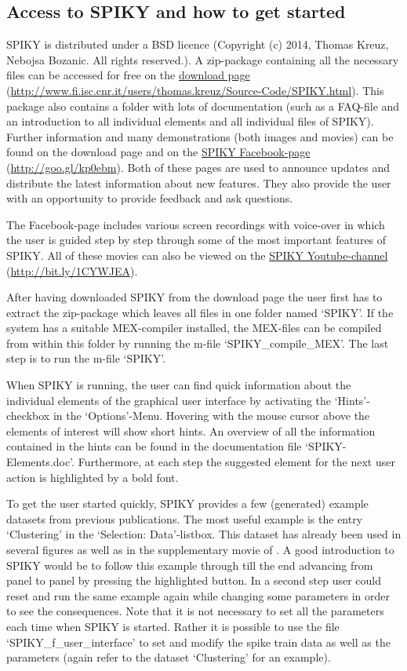 \documentclass[10pt,twocolumn]{elsart5p}
\begin{document}
\subsection{\label{ss:Access} Access to SPIKY and how to get started}

SPIKY is distributed under a BSD licence (Copyright (c) 2014, Thomas Kreuz, Nebojsa Bozanic. All rights reserved.). A zip-package containing all the necessary files can be accessed for free on the \href{http://www.fi.isc.cnr.it/users/thomas.kreuz/Source-Code/SPIKY.html}{download page} (\url{http://www.fi.isc.cnr.it/users/thomas.kreuz/Source-Code/SPIKY.html}). This package also contains a folder with lots of documentation (such as a FAQ-file and an introduction to all individual elements and all individual files of SPIKY). Further information and many demonstrations (both images and movies) can be found on the download page and on the \href{http://goo.gl/kp0ebm}{SPIKY Facebook-page} (\url{http://goo.gl/kp0ebm}). Both of these pages are used to announce updates and distribute the latest information about new features. They also provide the user with an opportunity to provide feedback and ask questions.

The Facebook-page includes various screen recordings with voice-over in which the user is guided step by step through some of the most important features of SPIKY. All of these movies can also be viewed on the \href{http://bit.ly/1CYWJEA}{SPIKY Youtube-channel} (\url{http://bit.ly/1CYWJEA}).

After having downloaded SPIKY from the download page the user first has to extract the zip-package which leaves all files in one folder named `SPIKY'. If the system has a suitable MEX-compiler installed, the MEX-files can be compiled from within this folder by running the m-file `SPIKY\_compile\_MEX'. The last step is to run the m-file `SPIKY'.

When SPIKY is running, the user can find quick information about the individual elements of the graphical user interface by activating the `Hints'-checkbox in the `Options'-Menu. Hovering with the mouse cursor above the elements of interest will show short hints. An overview of all the information contained in the hints can be found in the documentation file `SPIKY-Elements.doc'. Furthermore, at each step the suggested element for the next user action is highlighted by a bold font. 

To get the user started quickly, SPIKY provides a few (generated) example datasets from previous publications. The most useful example is the entry `Clustering' in the `Selection: Data'-listbox. This dataset has already been used in several figures as well as in the supplementary movie of \cite{Kreuz13}. A good introduction to SPIKY would be to follow this example through till the end advancing from panel to panel by pressing the highlighted button. In a second step user could reset and run the same example again while changing some parameters in order to see the consequences. Note that it is not necessary to set all the parameters each time when SPIKY is started. Rather it is possible to use the file `SPIKY\_f\_user\_interface' to set and modify the spike train data as well as the parameters (again refer to the dataset `Clustering' for an example).
\end{document}
